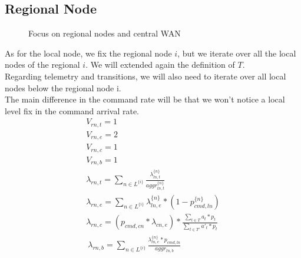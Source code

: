 \documentclass[11pt]{article}
\begin{document}
\subsection{Regional Node}
\begin{figure}[H]
	\centering
	\hspace*{-3.7cm}
	\frame{}
	\caption{Focus on regional nodes and central WAN}
\end{figure}
As for the local node, we fix the regional node $i$, but we iterate over all the local nodes of the regional $i$. We will extended again the definition of $T$.\\
Regarding telemetry and transitions, we will also need to iterate over all local nodes below the regional node i.\\
The main difference in the command rate will be that we won't notice a local level fix in the command arrival rate.
\begin{equation}
	\begin{array}{l}
		V_{rn, t} = 1 \\
		V_{rn, e} = 2 \\ %
		V_{rn, c} = 1 \\
		V_{rn, b} = 1 \\
        \lambda_{rn, t} = \sum\limits_{n \in L^{\{i\}}}{\frac{\lambda^{\{n\}}_{ln, t}}{aggr^{\{n\}}_{ln, t}}}  \\
        \lambda_{rn, e} = \sum\limits_{n \in L^{\{i\}}}{\lambda^{\{n\}}_{ln, e} * (1-p^{\{ n \}}_{cmd,ln})} \\
		\lambda_{rn,c}= (p_{cmd,cn} * \lambda_{cn, e})* \frac{\sum\limits_{t \in T}{a_{t} * p_{t}}}{\sum\limits_{t \in T'}{a'_{t} * p_{t}}} \\\
		\lambda_{rn,b}=\sum\limits_{n \in L^{\{i\}}}\frac{\lambda_{ln,e}^{\{n\}}*p_{cmd,ln}}{aggr_{ln,b}}\\

	\end{array}
\end{equation}
\end{document}
